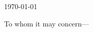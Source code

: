 \documentclass[10pt]{article}
\begin{document}
\today
\bigskip

To whom it may concern---
\bigskip

\lipsum[1-2]
\end{document}
